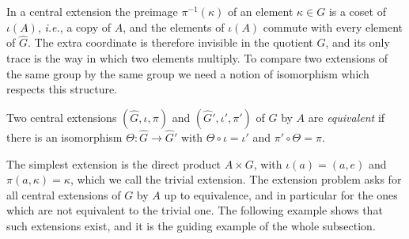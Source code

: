 In a central extension the preimage $\pi^{-1}(\kappa)$ of an element $\kappa\in G$ is a coset of $\iota(A)$, \textit{i.e.}, a copy of $A$, and the elements of $\iota(A)$ commute with every element of $\widehat{G}$. The extra coordinate is therefore invisible in the quotient $G$, and its only trace is the way in which two elements multiply. To compare two extensions of the same group by the same group we need a notion of isomorphism which respects this structure.

\begin{definition}\label{def:equiv-extensions}
	Two central extensions $(\widehat{G},\iota,\pi)$ and $(\widehat{G}',\iota',\pi')$ of $G$ by $A$ are \emph{equivalent} if there is an isomorphism $\Theta:\widehat{G}\to\widehat{G}'$ with $\Theta\circ\iota=\iota'$ and $\pi'\circ\Theta=\pi$.
\end{definition}

The simplest extension is the direct product $A\times G$, with $\iota(a)=(a,e)$ and $\pi(a,\kappa)=\kappa$, which we call the trivial extension. The extension problem asks for all central extensions of $G$ by $A$ up to equivalence, and in particular for the ones which are not equivalent to the trivial one. The following example shows that such extensions exist, and it is the guiding example of the whole subsection.

